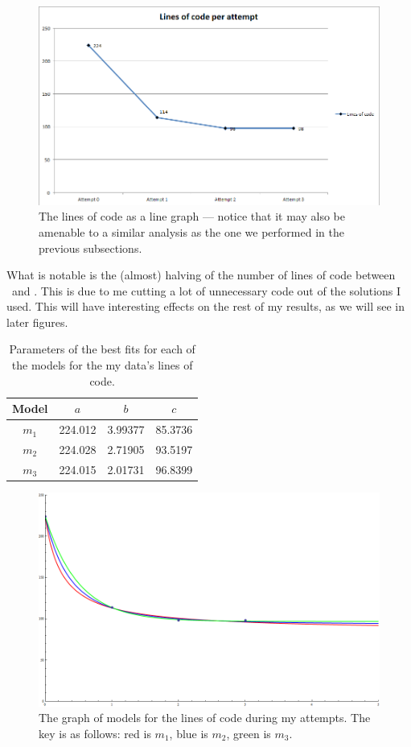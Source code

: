 \begin{figure}[ht!]
\centering
\includegraphics[scale=0.65]{./media/MyData_LOC.png}
\caption{The lines of code as a line graph --- notice that it may also be
  amenable to a similar analysis as the one we performed in the previous
    subsections.}
\label{figure:LOC}
\end{figure}

What is notable is the (almost) halving of the number of lines of code between
\AZ\ and \AO.
This is due to me cutting a lot of unnecessary code out of the solutions I used.
This will have interesting effects on the rest of my results, as we will see in
later figures.

\begin{table}[ht!]
\centering
\begin{tabular}{|c|c|c|c|}
\hline
{\bf Model} &  $a$ & $b$ & $c$ \\
\hline
$m_1$ & 224.012 & 3.99377 & 85.3736 \\
\hline
$m_2$ & 224.028 & 2.71905 & 93.5197\\
\hline
$m_3$ & 224.015 & 2.01731 & 96.8399 \\
\hline
\end{tabular}
\caption{Parameters of the best fits for each of the models for the my data's
  lines of code.}
\label{table:LOC:abc}
\end{table}

\begin{figure}[ht!]
\centering
\includegraphics[scale=0.35,angle=90]{./media/LOCGraph.png}
\caption{The graph of models for the lines of code during my attempts. The key is as follows:
		 red is $m_1$,
		 blue is $m_2$,
		 green is $m_3$.
}
	\label{figure:LOC:abc}
\end{figure}

